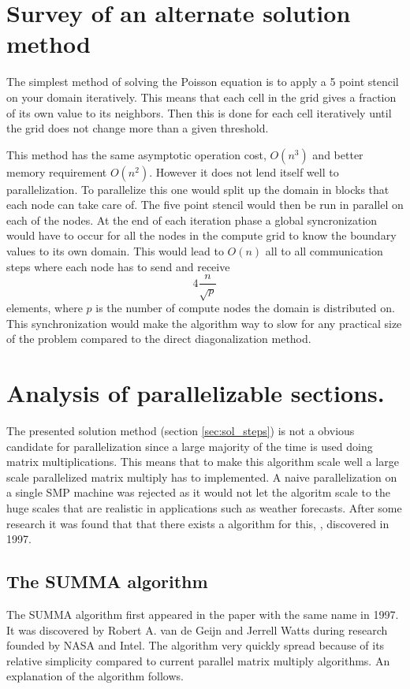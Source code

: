 \documentclass{article}
\begin{document}
\section{Survey of an alternate solution method}
The simplest method of solving the Poisson equation is to apply a 5 point stencil on your domain
iteratively. This means that each cell in the grid gives a fraction of its own value to its neighbors.
Then this is done for each cell iteratively until the grid does not change more than a given threshold.

This method has the same asymptotic operation cost, $O(n^3)$ and better memory requirement $O(n^2)$.
However it does not lend itself well to parallelization. To parallelize this one would split
up the domain in blocks that each node can take care of. The five point stencil would then be
run in parallel on each of the nodes. At the end of each iteration phase a global
syncronization would have to occur for all the nodes in the compute grid to know the boundary values
to its own domain. This would lead to $O(n)$ all to all communication steps where each node has to
send and receive
\[
4\frac{n}{\sqrt{p}}
\]
elements, where $p$ is the number of compute nodes the domain is distributed on.
This synchronization would make the algorithm way to slow for any practical size
of the problem compared to the direct diagonalization method.

\section{Analysis of parallelizable sections.}
The presented solution method (section \ref{sec:sol_steps}) is not a obvious candidate for parallelization
since a large majority of the time is used doing matrix multiplications.
This means that to make this algorithm scale well a large scale parallelized
matrix multiply has to implemented. A naive parallelization on a single SMP machine
was rejected as it would not let the algoritm scale to the huge scales that are realistic
in applications such as weather forecasts.
After some research it was found that that there exists a algorithm for this, \cite{summa}, discovered in 1997.

\subsection{The SUMMA algorithm}
The SUMMA algorithm first appeared in the paper\cite{summa} with the same name in 1997.
It was discovered by Robert A. van de Geijn and Jerrell Watts during research founded by
NASA and Intel. The algorithm very quickly spread because of its relative simplicity compared
to current parallel matrix multiply algorithms. An explanation of the algorithm follows.
\end{document}
